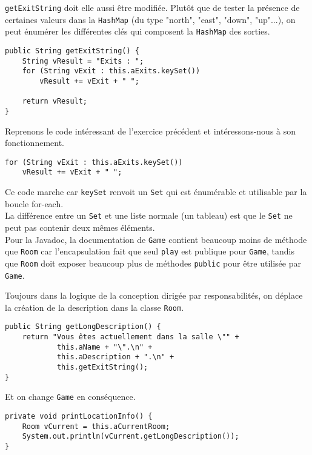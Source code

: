 \begin{exercise}[subtitle=keySet]

\verb|getExitString| doit elle aussi être modifiée. Plutôt que de tester la présence de certaines valeurs dans la \verb|HashMap| (du type "north", "east", "down", "up"...), on peut énumérer les différentes clés qui composent la \verb|HashMap| des sorties.

\begin{verbatim}
public String getExitString() {
    String vResult = "Exits : ";
    for (String vExit : this.aExits.keySet())
        vResult += vExit + " ";

    return vResult;
}
\end{verbatim}
\end{exercise}

\begin{exercise}[subtitle=Fonctionnement de keySet et Javadoc]

Reprenons le code intéressant de l'exercice précédent et intéressons-nous à son fonctionnement.

\begin{verbatim}
for (String vExit : this.aExits.keySet())
    vResult += vExit + " ";
\end{verbatim}

Ce code marche car \verb|keySet| renvoit un \verb|Set| qui est énumérable et utilisable par la boucle for-each.\\

La différence entre un \verb|Set| et une liste normale (un tableau) est que le \verb|Set| ne peut pas contenir deux mêmes éléments.\\

Pour la Javadoc, la documentation de \verb|Game| contient beaucoup moins de méthode que \verb|Room| car l'encapsulation fait que seul \verb|play| est publique pour \verb|Game|, tandis que \verb|Room| doit exposer beaucoup plus de méthodes \verb|public| pour être utilisée par \verb|Game|.

\end{exercise}

\begin{exercise}[subtitle=getLongDescription]

Toujours dans la logique de la conception dirigée par responsabilités, on déplace la création de la description dans la classe \verb|Room|.

\begin{verbatim}
public String getLongDescription() {
    return "Vous êtes actuellement dans la salle \"" +
            this.aName + "\".\n" +
            this.aDescription + ".\n" +
            this.getExitString();
}
\end{verbatim}

Et on change \verb|Game| en conséquence.

\begin{verbatim}
private void printLocationInfo() {
    Room vCurrent = this.aCurrentRoom;
    System.out.println(vCurrent.getLongDescription());
}
\end{verbatim}
\end{exercise}

